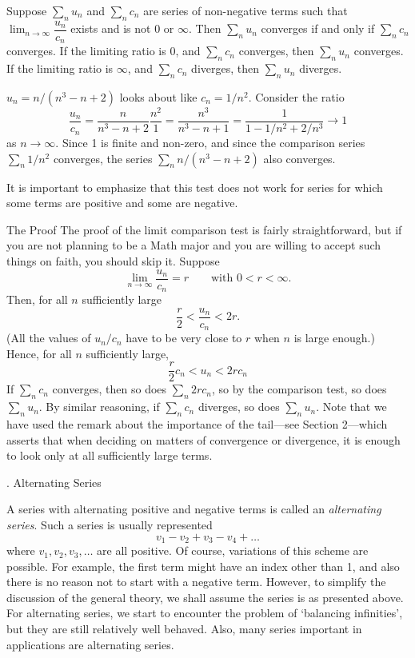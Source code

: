  Suppose $\sum_n u_n$ and
$\sum_n c_n$ are series of non-negative terms such that
$\lim_{n\to \infty} \dfrac {u_n}{c_n}$ exists and is not
0 or $\infty$.  Then $\sum_n u_n$ converges if and only if
%
$\sum_n c_n$ converges.  If the limiting ratio is 0, and
$\sum_n c_n$ converges, then $\sum_n u_n$ converges.  If the
limiting ratio is $\infty$, and $\sum_n c_n$ diverges, then
$\sum_n u_n$ diverges.
\endproclaim

  $u_n = n/(n^3 - n + 2)$ looks
about like $c_n = 1/n^2$.  Consider the ratio
$$
\frac{u_n}{c_n} = \frac n{n^3 - n + 2}\frac {n^2} 1
   = \frac{n^3}{n^3 - n + 1} = \frac 1{1 - 1/n^2 + 2/n^3} \to 1
$$
as $n \to \infty$.  Since 1 is finite and non-zero, and since
the comparison series $\sum_n 1/n^2$ converges, the series
$\sum_n n/(n^3 - n + 2)$ also converges.
\endexample

It is important to emphasize that this test does not work
for series for which some terms are positive and some are
negative.

\subhead The Proof \endsubhead
The proof of the limit comparison test is fairly straightforward,
but if you are not planning to be a Math major and you are
willing to accept such things on faith, you should skip it.
Suppose
$$
\lim_{n\to \infty} \frac{u_n}{c_n} = r\qquad\text{with }
0 < r < \infty.
$$
Then, 
for all $n$ sufficiently large
$$
\frac r2  < \frac{u_n}{c_n} < 2r.
$$
(All the values of $u_n/c_n$ have to be very close to $r$ when
$n$ is large enough.)   Hence, for all $n$ sufficiently large,
$$
\frac r2 c_n < u_n < 2rc_n
$$
If $\sum_n c_n$ converges, then so does $\sum_n 2rc_n$, so by
the comparison test, so does $\sum_n u_n$.   By similar reasoning,
if $\sum_n c_n$ diverges, so does $\sum_n u_n$.   Note that we
have used the remark about the importance of
the tail---see Section 2---which asserts that when deciding
on matters of convergence or divergence, it is enough to look only
at all sufficiently large terms.

\bigskip

\bigskip
{}
\head \sn. Alternating Series \endhead

A series with alternating positive and negative terms is called
an {\it alternating series}.  Such a series is usually
represented
$$
  v_1 - v_2 + v_3 - v_4 + \dots
$$
where $v_1, v_2, v_3, \dots$ are all positive.  Of course, variations
of this scheme are possible.  For example, the first term might have
an index other than 1, and also there is no reason not to start
%
with a negative term.   However, to simplify the discussion of
the general theory, we shall assume the series is as presented
above.  For alternating series, we start to encounter the problem
of `balancing infinities', but they are still relatively well
behaved.  Also, many series important in applications are
alternating series.

